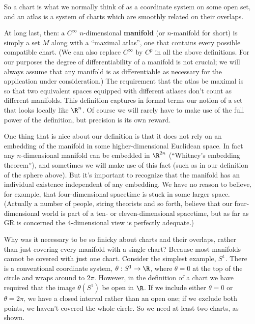 \documentclass[12pt]{article}
\begin{document}
\noindent So a chart is what we normally think of as a coordinate system on
some open set, and an atlas is a system of charts which are smoothly
related on their overlaps.

At long last, then: a $C^\infty$ $n$-dimensional {\bf manifold} (or 
$n$-manifold for short) is simply a set $M$ along with a ``maximal atlas'',
one that contains every possible compatible chart.  (We can also replace 
$C^\infty$ by $C^p$ in all the above definitions.  For our purposes the degree
of differentiability of a manifold is not crucial; we will always assume
that any manifold is as differentiable as necessary for the application
under consideration.)  The requirement that the 
atlas be maximal is so that two equivalent spaces equipped with
different atlases don't count as different manifolds.
This definition captures in
formal terms our notion of a set that looks locally like $\R^n$.
Of course we will rarely have to make use of the full power of the
definition, but precision is its own reward.  

One thing that is nice about our definition is that it does not rely
on an embedding of the manifold in some higher-dimensional Euclidean
space.  In fact any $n$-dimensional manifold can be embedded in
$\R^{2n}$ (``Whitney's embedding theorem''), 
and sometimes we will make use of this fact (such as
in our definition of the sphere above).  But it's important to 
recognize that the manifold has an individual existence independent
of any embedding.  We have no reason to believe, for example, that
four-dimensional spacetime is stuck in some larger space.  (Actually
a number of people, string theorists and so forth, believe that our
four-dimensional world is part of a ten- or eleven-dimensional
spacetime, but as far as GR
is concerned the 4-dimensional view is perfectly adequate.)

Why was it necessary to be so finicky about charts and their overlaps,
rather than just covering every manifold with a single chart?  Because
most manifolds cannot be covered with just one chart.  Consider the
simplest example, $S^1$.  There is a conventional coordinate system,
$\theta: S^1\rightarrow\R$, where $\theta=0$ at the top of the circle
and wraps around to $2\pi$.  However, in the definition of a chart we
have required that the image $\theta(S^1)$ be open in $\R$.  If we 
include either $\theta=0$ or $\theta=2\pi$, we have a closed interval
rather than an open one; if we exclude both points, we haven't covered
the whole circle.  So we need at least two charts, as shown.
\end{document}
